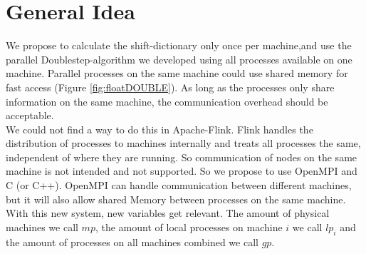 \documentclass[12pt]{article}
\begin{document}
\section{General Idea}

We propose to calculate the shift-dictionary only once per machine,and use the parallel Doublestep-algorithm we developed using all processes available on one machine. Parallel processes on the same machine could use shared memory for fast access (Figure \ref{fig:floatDOUBLE}). As long as the processes only share information on the same machine, the communication overhead should be acceptable.\\

We could not find a way to do this in Apache-Flink. Flink handles the distribution of processes to machines internally and treats all processes the same, independent of where they are running. So communication of nodes on the same machine is not intended and not supported. So we propose to use OpenMPI and C (or C++). OpenMPI can handle communication between different machines, but it will also allow shared Memory between processes on the same machine.\\

With this new system, new variables get relevant. The amount of physical machines we call $mp$, the amount of local processes on machine $i$ we call $lp_i$ and the amount of processes on all machines combined we call $gp$.
\end{document}
